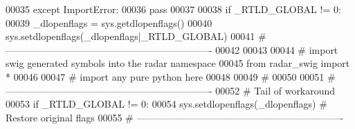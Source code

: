 \begin{DoxyCode}
00035     \textcolor{keywordflow}{except} ImportError:
00036     \textcolor{keywordflow}{pass}
00037 
00038 \textcolor{keywordflow}{if} \_RTLD\_GLOBAL != 0:
00039     \_dlopenflags = sys.getdlopenflags()
00040     sys.setdlopenflags(\_dlopenflags|\_RTLD\_GLOBAL)
00041 \textcolor{comment}{# ----------------------------------------------------------------}
00042 
00043 
00044 \textcolor{comment}{# import swig generated symbols into the radar namespace}
00045 \textcolor{keyword}{from} radar\_swig \textcolor{keyword}{import} *
00046 
00047 \textcolor{comment}{# import any pure python here}
00048 
00049 \textcolor{comment}{#}
00050 
00051 \textcolor{comment}{# ----------------------------------------------------------------}
00052 \textcolor{comment}{# Tail of workaround}
00053 \textcolor{keywordflow}{if} \_RTLD\_GLOBAL != 0:
00054     sys.setdlopenflags(\_dlopenflags)      \textcolor{comment}{# Restore original flags}
00055 \textcolor{comment}{# ----------------------------------------------------------------}
\end{DoxyCode}
